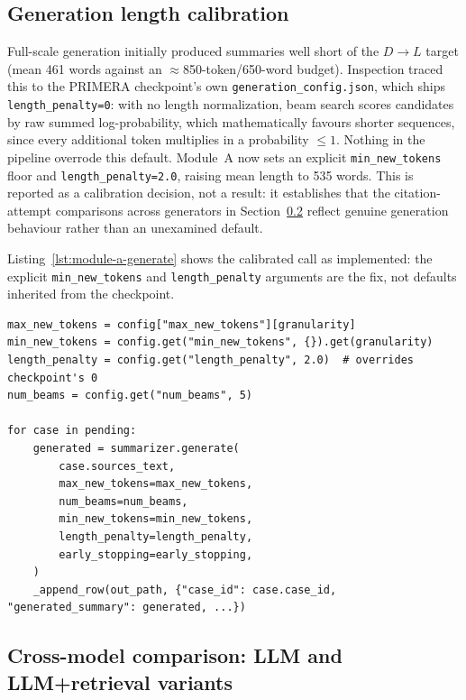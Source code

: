 \subsection{Generation length calibration}
Full-scale generation initially produced summaries well short of the $D\rightarrow L$ target (mean 461 words against an $\approx$850-token/650-word budget). Inspection traced this to the PRIMERA checkpoint's own \texttt{generation\_config.json}, which ships \texttt{length\_penalty=0}: with no length normalization, beam search scores candidates by raw summed log-probability, which mathematically favours shorter sequences, since every additional token multiplies in a probability $\le 1$. Nothing in the pipeline overrode this default. Module~A now sets an explicit \texttt{min\_new\_tokens} floor and \texttt{length\_penalty=2.0}, raising mean length to 535 words. This is reported as a calibration decision, not a result: it establishes that the citation-attempt comparisons across generators in Section~\ref{sec:module-a-crossmodel} reflect genuine generation behaviour rather than an unexamined default.

Listing~\ref{lst:module-a-generate} shows the calibrated call as implemented: the explicit \texttt{min\_new\_tokens} and \texttt{length\_penalty} arguments are the fix, not defaults inherited from the checkpoint.

\begin{lstlisting}[caption={Module~A batch generation call with the length-calibration fix explicit (\href{\repourl/blob/main/src/module_a_summarizer/generate.py}{\texttt{src/module\_a\_summarizer/generate.py}}).}, label={lst:module-a-generate}]
max_new_tokens = config["max_new_tokens"][granularity]
min_new_tokens = config.get("min_new_tokens", {}).get(granularity)
length_penalty = config.get("length_penalty", 2.0)  # overrides checkpoint's 0
num_beams = config.get("num_beams", 5)

for case in pending:
    generated = summarizer.generate(
        case.sources_text,
        max_new_tokens=max_new_tokens,
        num_beams=num_beams,
        min_new_tokens=min_new_tokens,
        length_penalty=length_penalty,
        early_stopping=early_stopping,
    )
    _append_row(out_path, {"case_id": case.case_id, "generated_summary": generated, ...})
\end{lstlisting}

\subsection{Cross-model comparison: LLM and LLM+retrieval variants}
\label{sec:module-a-crossmodel}

